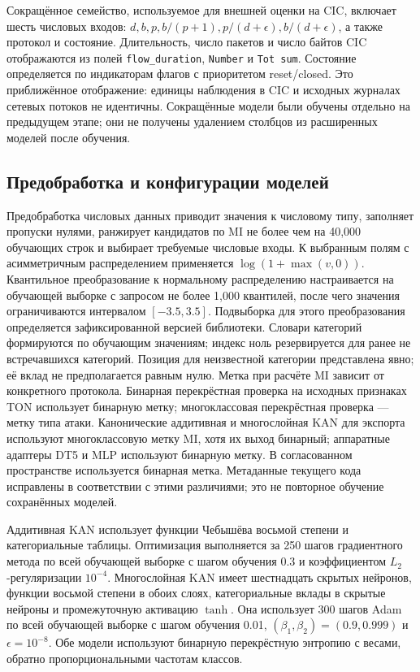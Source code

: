 Сокращённое семейство, используемое для внешней оценки на CIC, включает шесть числовых входов: $d,b,p,b/(p+1),p/(d+\epsilon),b/(d+\epsilon)$, а также протокол и состояние. Длительность, число пакетов и число байтов CIC отображаются из полей \texttt{flow\_duration}, \texttt{Number} и \texttt{Tot sum}. Состояние определяется по индикаторам флагов с приоритетом reset/closed. Это приближённое отображение: единицы наблюдения в CIC и исходных журналах сетевых потоков не идентичны. Сокращённые модели были обучены отдельно на предыдущем этапе; они не получены удалением столбцов из расширенных моделей после обучения.

\subsection{Предобработка и конфигурации моделей}
Предобработка числовых данных приводит значения к числовому типу, заполняет пропуски нулями, ранжирует кандидатов по MI не более чем на 40,000 обучающих строк и выбирает требуемые числовые входы. К выбранным полям с асимметричным распределением применяется $\log(1+\max(v,0))$. Квантильное преобразование к нормальному распределению настраивается на обучающей выборке с запросом не более 1,000 квантилей, после чего значения ограничиваются интервалом $[-3.5,3.5]$. Подвыборка для этого преобразования определяется зафиксированной версией библиотеки. Словари категорий формируются по обучающим значениям; индекс ноль резервируется для ранее не встречавшихся категорий. Позиция для неизвестной категории представлена явно; её вклад не предполагается равным нулю. Метка при расчёте MI зависит от конкретного протокола. Бинарная перекрёстная проверка на исходных признаках TON использует бинарную метку; многоклассовая перекрёстная проверка --- метку типа атаки. Канонические аддитивная и многослойная KAN для экспорта используют многоклассовую метку MI, хотя их выход бинарный; аппаратные адаптеры DT5 и MLP используют бинарную метку. В согласованном пространстве используется бинарная метка. Метаданные текущего кода исправлены в соответствии с этими различиями; это не повторное обучение сохранённых моделей.

Аддитивная KAN использует функции Чебышёва восьмой степени и категориальные таблицы. Оптимизация выполняется за 250 шагов градиентного метода по всей обучающей выборке с шагом обучения 0.3 и коэффициентом $L_2$-регуляризации $10^{-4}$. Многослойная KAN имеет шестнадцать скрытых нейронов, функции восьмой степени в обоих слоях, категориальные вклады в скрытые нейроны и промежуточную активацию $\tanh$. Она использует 300 шагов Adam по всей обучающей выборке с шагом обучения 0.01, $(\beta_1,\beta_2)=(0.9,0.999)$ и $\epsilon=10^{-8}$. Обе модели используют бинарную перекрёстную энтропию с весами, обратно пропорциональными частотам классов.

